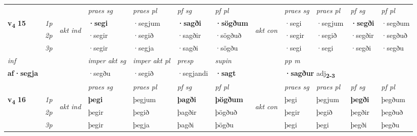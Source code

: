 \begin{longtable}[l]{X>{\footnotesize\itshape}llXXXXlXXXX}
 & &   & \textit{praes sg}  & \textit{praes pl}    & \textit{ pf sg} & \textit{pf pl} & & \textit{praes sg}  & \textit{praes pl}    & \textit{pf sg} & \textit{pf pl }  \\ \cmidrule{4-7} \cmidrule{9-12}
 \multirow{2}{*}{{{\textbf{v{\textsubscript{4}}} \Large{\textbf{15}}}}}  & 1p & \multirow{3}{*}{\begin{turn}{90}\textit{akt ind}\end{turn}} & \textbf{·segi} & ·segjum & \textbf{·sagði} & \textbf{·sögðum} & \multirow{3}{*}{\begin{turn}{90}\textit{akt con}\end{turn}} &·segi & ·segjum & \textbf{·segði} & ·segðum\\*
 & 2p &  &  ·segir  & ·segið & ·sagðir & ·sögðuð & & ·segir & ·segið & ·segðir & ·segðuð \\*
 & 3p &  & ·segir & ·segja & ·sagði & ·sögðu & & ·segi & ·segi& ·segði & ·segðu \\*
\cmidrule{4-7} \cmidrule{9-12}

   {\textit{inf}} & &  & \textit{imper akt sg} & \textit{imper akt pl}   & \textit{presp} & \textit{supin}  && \textit{pp m} \\*
  {\textbf{af\allowbreak ·segja}} & && ·segðu  & ·segið   & ·segjandi &  \textbf{·sagt}  && \multicolumn{2}{l}{\textbf{·sagður} adj\textbf{\textsubscript{2-3}}} \\*

\midrule

 & &   & \textit{praes sg}  & \textit{praes pl}    & \textit{ pf sg} & \textit{pf pl} & & \textit{praes sg}  & \textit{praes pl}    & \textit{pf sg} & \textit{pf pl }  \\ \cmidrule{4-7} \cmidrule{9-12}
 \multirow{2}{*}{{{\textbf{v{\textsubscript{4}}} \Large{\textbf{16}}}}}  & 1p & \multirow{3}{*}{\begin{turn}{90}\textit{akt ind}\end{turn}} & \textbf{þegi} & þegjum & \textbf{þagði} & \textbf{þögðum} & \multirow{3}{*}{\begin{turn}{90}\textit{akt con}\end{turn}} &þegi & þegjum & \textbf{þegði} & þegðum\\*
 & 2p &  &  þegir  & þegið & þagðir & þögðuð & & þegir & þegið & þegðir & þegðuð \\*
 & 3p &  & þegir & þegja & þagði & þögðu & & þegi & þegi& þegði & þegðu \\*
\cmidrule{4-7} \cmidrule{9-12}


\end{longtable}
